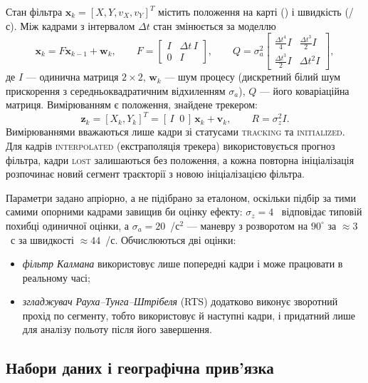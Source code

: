 \documentclass[a4paper, 12pt, titlepage]{article}
\begin{document}
Стан фільтра $\mathbf{x}_k = [X, Y, v_X, v_Y]^T$ містить положення на карті (\px{}) і швидкість (\px{}/с). Між кадрами з інтервалом $\Delta t$ стан змінюється за моделлю
\begin{equation}
\mathbf{x}_k = F \mathbf{x}_{k-1} + \mathbf{w}_k, \qquad
F = \begin{bmatrix} I & \Delta t \, I \\ 0 & I \end{bmatrix}, \qquad
Q = \sigma_a^2 \begin{bmatrix} \tfrac{\Delta t^4}{4} I & \tfrac{\Delta t^3}{2} I \\ \tfrac{\Delta t^3}{2} I & \Delta t^2 I \end{bmatrix},
\end{equation}
де $I$ --- одинична матриця $2 \times 2$, $\mathbf{w}_k$ --- шум процесу (дискретний білий шум прискорення з середньоквадратичним відхиленням $\sigma_a$), $Q$ --- його коваріаційна матриця. Вимірюванням є положення, знайдене трекером:
\begin{equation}
\mathbf{z}_k = [X_k, Y_k]^T = [\, I \;\; 0 \,] \, \mathbf{x}_k + \mathbf{v}_k, \qquad R = \sigma_z^2 I .
\end{equation}
Вимірюваннями вважаються лише кадри зі статусами \textsc{tracking} та \textsc{initialized}. Для кадрів \textsc{interpolated} (екстраполяція трекера) використовується прогноз фільтра, кадри \textsc{lost} залишаються без положення, а кожна повторна ініціалізація розпочинає новий сегмент траєкторії з новою ініціалізацією фільтра.

Параметри задано апріорно, а не підібрано за еталоном, оскільки підбір за тими самими опорними кадрами завищив би оцінку ефекту: $\sigma_z = 4$~\px{} відповідає типовій похибці одиничної оцінки, а $\sigma_a = 20$~\px{}/с$^2$ --- маневру з розворотом на $90^\circ$ за $\approx 3$~с за швидкості $\approx 44$~\px{}/с. Обчислюються дві оцінки:
\begin{itemize}
    \item \emph{фільтр Калмана} використовує лише попередні кадри і може працювати в реальному часі;
    \item \emph{згладжувач Рауха--Тунга--Штрібеля} (RTS) \cite{rts} додатково виконує зворотний прохід по сегменту, тобто використовує й наступні кадри, і придатний лише для аналізу польоту після його завершення.
\end{itemize}

\subsection{Набори даних і географічна прив'язка}
\label{sec:datasets}
\end{document}
